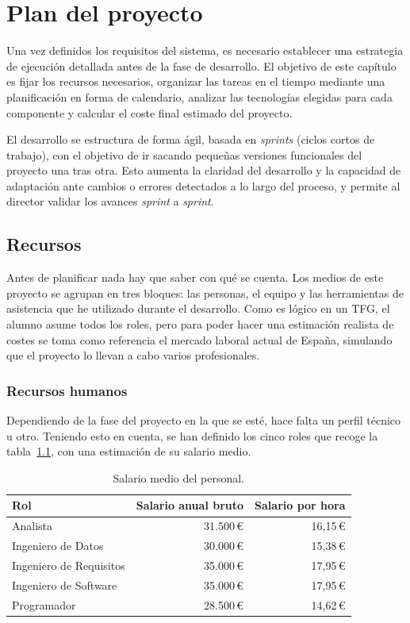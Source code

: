 \chapter{Plan del proyecto}

Una vez definidos los requisitos del sistema, es necesario establecer una estrategia de ejecución
detallada antes de la fase de desarrollo. El objetivo de este capítulo es fijar los recursos
necesarios, organizar las tareas en el tiempo mediante una planificación en forma de calendario,
analizar las tecnologías elegidas para cada componente y calcular el coste final estimado del
proyecto.

El desarrollo se estructura de forma ágil, basada en \textit{sprints} (ciclos cortos de trabajo),
con el objetivo de ir sacando pequeñas versiones funcionales del proyecto una tras otra. Esto
aumenta la claridad del desarrollo y la capacidad de adaptación ante cambios o errores detectados a
lo largo del proceso, y permite al director validar los avances \textit{sprint} a \textit{sprint}.

\section{Recursos}

Antes de planificar nada hay que saber con qué se cuenta. Los medios de este proyecto se agrupan en
tres bloques: las personas, el equipo y las herramientas de asistencia que he utilizado durante el
desarrollo. Como es lógico en un TFG, el alumno asume
todos los roles, pero para poder hacer una estimación realista de costes se toma como referencia el
mercado laboral actual de España, simulando que el proyecto lo llevan a cabo varios profesionales.

\subsection{Recursos humanos}

Dependiendo de la fase del proyecto en la que se esté, hace falta un perfil técnico u otro. Teniendo
esto en cuenta, se han definido los cinco roles que recoge la tabla~\ref{tab:salarios}, con una
estimación de su salario medio.

\begin{table}[H]
	\centering
	\caption{Salario medio del personal.}
	\label{tab:salarios}
	\begin{tabularx}{0.75\textwidth}{X r r}
		\toprule
		\textbf{Rol} & \textbf{Salario anual bruto} & \textbf{Salario por hora} \\
		\midrule
		Analista                  & 31.500\,\euro{} & 16,15\,\euro{} \\
		Ingeniero de Datos        & 30.000\,\euro{} & 15,38\,\euro{} \\
		Ingeniero de Requisitos   & 35.000\,\euro{} & 17,95\,\euro{} \\
		Ingeniero de Software     & 35.000\,\euro{} & 17,95\,\euro{} \\
		Programador               & 28.500\,\euro{} & 14,62\,\euro{} \\
		\bottomrule
	\end{tabularx}
\end{table}

